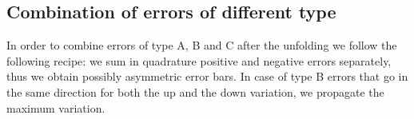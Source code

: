 

\subsection{Combination of errors of different type}\label{subsec:embedded_unfolding}
In order to combine errors of type A, B and C after the unfolding we follow the following recipe: we sum in quadrature positive and negative errors separately, thus we obtain possibly asymmetric error bars. In case of type B errors that go in the same direction for both the up and the down variation, we propagate the maximum variation.


